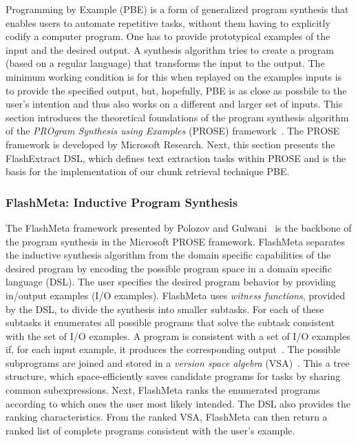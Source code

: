 Programming by Example (PBE) is a form of generalized program
synthesis that enables users to automate repetitive tasks, without
them having to explicitly codify a computer program.
One has to
provide prototypical examples of the input and the desired output.
A
synthesis algorithm tries to create a program (based on a regular
language) that transforms the input to the output.
The minimum working
condition is for this when replayed on the examples inputs is to
provide the specified output, but, hopefully, PBE is as close as
possbile to the user's intention and thus also works on a different
and larger set of inputs.
This section introduces the theoretical
foundations of the program synthesis algorithm of the \emph{PROgram
Synthesis using Examples} (PROSE) framework~\cite{prose2019webpage}.
The PROSE framework is developed by Microsoft Research.
Next, this
section presents the FlashExtract DSL, which defines text extraction
tasks within PROSE and is the basis for the implementation of our
chunk retrieval technique PBE\@.

\subsubsection{FlashMeta: Inductive Program Synthesis}
The FlashMeta framework presented by Polozov and
Gulwani~\cite{polozov2015flashmeta:} is the backbone of the program
synthesis in the Microsoft PROSE framework.
FlashMeta separates the
inductive synthesis algorithm from the domain specific capabilities of
the desired program by encoding the possible program space in a domain
specific language (DSL).
The user specifies the desired program
behavior by providing in/output examples (I/O examples).
FlashMeta
uses \emph{witness functions}, provided by the DSL, to divide the
synthesis into smaller subtasks.
For each of these subtasks it
enumerates all possible programs that solve the subtask consistent
with the set of I/O examples.
A program is consistent with a set of
I/O examples if, for each input example, it produces the corresponding
output~\cite{mitchell1982generalization}.
The possible subprograms are
joined and stored in a \emph{version space algebra}
(VSA)~\cite{mitchell1982generalization}.
This a tree structure, which
space-efficiently saves candidate programs for tasks by sharing common
subexpressions.
Next, FlashMeta ranks the enumerated programs
according to which ones the user most likely intended.
The DSL also
provides the ranking characteristics.
From the ranked VSA, FlashMeta
can then return a ranked list of complete programs consistent with the
user's example.

